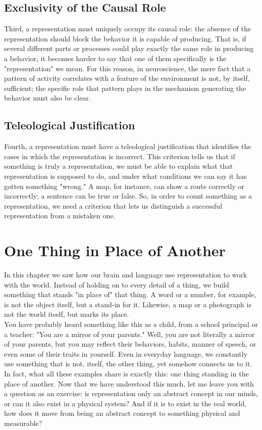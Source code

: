 \subsection{Exclusivity of the Causal Role}
\label{sub:criterion-exclusivity}
Third, a representation must uniquely occupy its causal role: the absence of the representation should block the behavior it is capable of producing. That is, if several different parts or processes could play exactly the same role in producing a behavior, it becomes harder to say that one of them specifically is the "representation" we mean. For this reason, in neuroscience, the mere fact that a pattern of activity correlates with a feature of the environment is not, by itself, sufficient; the specific role that pattern plays in the mechanism generating the behavior must also be clear.
\newpage
\subsection{Teleological Justification}
\label{sub:criterion-teleological}
Fourth, a representation must have a teleological justification that identifies the cases in which the representation is incorrect. This criterion tells us that if something is truly a representation, we must be able to explain what that representation is supposed to do, and under what conditions we can say it has gotten something "wrong." A map, for instance, can show a route correctly or incorrectly; a sentence can be true or false. So, in order to count something as a representation, we need a criterion that lets us distinguish a successful representation from a mistaken one.
\newpage
\section{One Thing in Place of Another}
\label{sec:something-in-place-of-another}
In this chapter we saw how our brain and language use representation to work with the world. Instead of holding on to every detail of a thing, we build something that stands "in place of" that thing. A word or a number, for example, is not the object itself, but a stand-in for it. Likewise, a map or a photograph is not the world itself, but marks its place.\\
You have probably heard something like this as a child, from a school principal or a teacher: "You are a mirror of your parents." Well, you are not literally a mirror of your parents, but you may reflect their behaviors, habits, manner of speech, or even some of their traits in yourself. Even in everyday language, we constantly use something that is not, itself, the other thing, yet somehow connects us to it.\\
In fact, what all these examples share is exactly this: one thing standing in the place of another. Now that we have understood this much, let me leave you with a question as an exercise: is representation only an abstract concept in our minds, or can it also exist in a physical system? And if it is to exist in the real world, how does it move from being an abstract concept to something physical and measurable?

